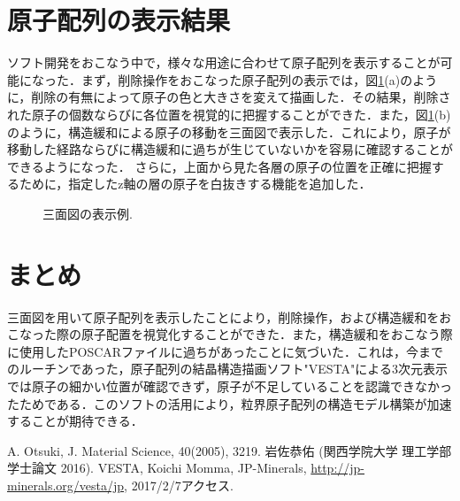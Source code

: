 \documentclass[a4j,twocolumn]{jsarticle}
\begin{document}
\section{原子配列の表示結果}
ソフト開発をおこなう中で，様々な用途に合わせて原子配列を表示することが可能になった．まず，削除操作をおこなった原子配列の表示では，図\ref{fig:two}(a)のように，削除の有無によって原子の色と大きさを変えて描画した．その結果，削除された原子の個数ならびに各位置を視覚的に把握することができた．また，図\ref{fig:two}(b)のように，構造緩和による原子の移動を三面図で表示した．これにより，原子が移動した経路ならびに構造緩和に過ちが生じていないかを容易に確認することができるようになった． さらに，上面から見た各層の原子の位置を正確に把握するために，指定したz軸の層の原子を白抜きする機能を追加した．

\begin{figure}[H]
\caption{{\footnotesize 三面図の表示例.}}
\label{fig:two}
\end{figure}

\section{まとめ}
三面図を用いて原子配列を表示したことにより，削除操作，および構造緩和をおこなった際の原子配置を視覚化することができた．また，構造緩和をおこなう際に使用したPOSCARファイルに過ちがあったことに気づいた．これは，今までのルーチンであった，原子配列の結晶構造描画ソフト"VESTA"による3次元表示では原子の細かい位置が確認できず，原子が不足していることを認識できなかったためである．このソフトの活用により，粒界原子配列の構造モデル構築が加速することが期待できる．

\begin{thebibliography}{9}
 A. Otsuki, J. Material Science, 40(2005), 3219.
 岩佐恭佑 (関西学院大学 理工学部 学士論文 2016).
 VESTA, Koichi Momma, JP-Minerals, \url{http://jp-minerals.org/vesta/jp}, 2017/2/7アクセス.
\end{thebibliography}
\end{document}
